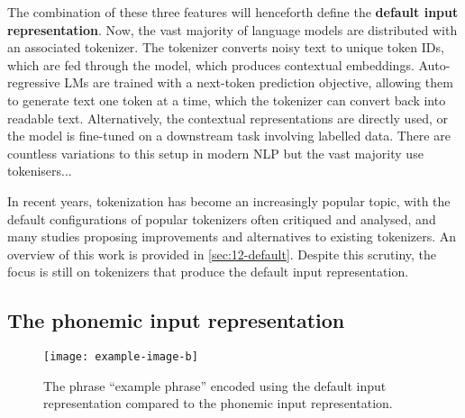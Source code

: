 The combination of these three features will henceforth define the \textbf{default input representation}. Now, the vast majority of language models are distributed with an associated tokenizer. The tokenizer converts noisy text to unique token IDs, which are fed through the model, which produces contextual embeddings. Auto-regressive LMs are trained with a next-token prediction objective, allowing them to generate text one token at a time, which the tokenizer can convert back into readable text. Alternatively, the contextual representations are directly used, or the model is fine-tuned on a downstream task involving labelled data. There are countless variations to this setup in modern NLP but the vast majority use tokenisers...

In recent years, tokenization has become an increasingly popular topic, with the default configurations of popular tokenizers often critiqued and analysed, and many studies proposing improvements and alternatives to existing tokenizers. An overview of this work is provided in \cref{sec:12-default}. Despite this scrutiny, the focus is still on tokenizers that produce the default input representation. 

\subsection{The phonemic input representation}\label{sec:12-phonemic}




\begin{figure}[t]
    \centering
    \texttt{[image: example-image-b]}
    \caption{The phrase ``example phrase'' encoded using the default input representation compared to the phonemic input representation.}
    \label{fig:12-representation}
\end{figure}

